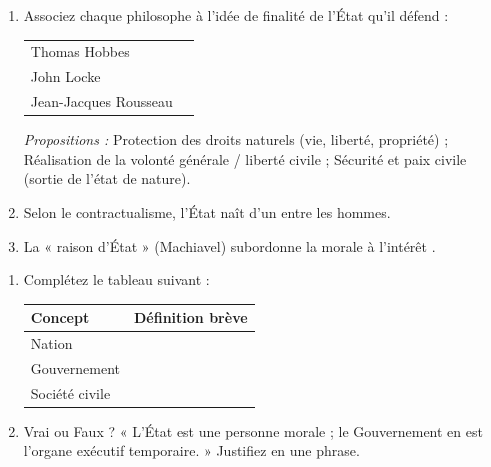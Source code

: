 \documentclass[11pt]{article}
\begin{document}
\begin{exercice}
\begin{enumerate}
    \item Associez chaque philosophe à l'idée de finalité de l'État qu'il défend :
    \begin{tabular}{ll}
        Thomas Hobbes & \underline{\hspace{5cm}} \\
        John Locke    & \underline{\hspace{5cm}} \\
        Jean-Jacques Rousseau & \underline{\hspace{5cm}} \\
    \end{tabular}
    \textit{Propositions :} Protection des droits naturels (vie, liberté, propriété) ; Réalisation de la volonté générale / liberté civile ; Sécurité et paix civile (sortie de l'état de nature).
    \item Selon le contractualisme, l'État naît d'un \underline{\hspace{4cm}} entre les hommes.
    \item La « raison d'État » (Machiavel) subordonne la morale à l'intérêt \underline{\hspace{3cm}}.
\end{enumerate}
\end{exercice}

\begin{exercice}
\begin{enumerate}
    \item Complétez le tableau suivant :
    \begin{tabular}{|l|p{8cm}|}
        \hline
        \textbf{Concept} & \textbf{Définition brève} \\
        \hline
        Nation & \\
        \hline
        Gouvernement & \\
        \hline
        Société civile & \\
        \hline
    \end{tabular}
    \item Vrai ou Faux ? « L'État est une personne morale ; le Gouvernement en est l'organe exécutif temporaire. » Justifiez en une phrase.
\end{enumerate}
\end{exercice}
\end{document}
